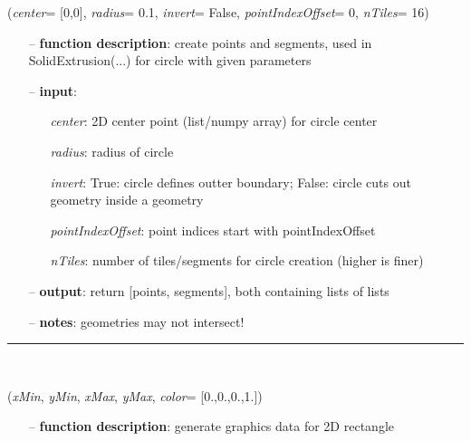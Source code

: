 \begin{itemize}[leftmargin=1.4cm]
\begin{itemize}[leftmargin=1.4cm]
\begin{itemize}[leftmargin=1.4cm]
\begin{itemize}[leftmargin=0.5cm]
\begin{itemize}[leftmargin=1.4cm]
\begin{itemize}[leftmargin=1.4cm]
\begin{itemize}[leftmargin=0.5cm]
\begin{itemize}[leftmargin=1.4cm]
\begin{itemize}[leftmargin=1.4cm]
\begin{itemize}[leftmargin=0.5cm]
\begin{flushleft}
\label{sec:graphicsDataUtilities:CirclePointsAndSegments}
({\it center}= [0,0], {\it radius}= 0.1, {\it invert}= False, {\it pointIndexOffset}= 0, {\it nTiles}= 16)
\end{flushleft}
\setlength{\itemindent}{0.7cm}
\begin{itemize}[leftmargin=0.7cm]
\item[--]
{\bf function description}: create points and segments, used in SolidExtrusion(...) for circle with given parameters
\item[--]
{\bf input}: \vspace{-6pt}
\begin{itemize}[leftmargin=1.2cm]
\setlength{\itemindent}{-0.7cm}
\item[]{\it center}: 2D center point (list/numpy array) for circle center
\item[]{\it radius}: radius of circle
\item[]{\it invert}: True: circle defines outter boundary; False: circle cuts out geometry inside a geometry
\item[]{\it pointIndexOffset}: point indices start with pointIndexOffset
\item[]{\it nTiles}: number of tiles/segments for circle creation (higher is finer)
\end{itemize}
\item[--]
{\bf output}: return [points, segments], both containing lists of lists
\item[--]
{\bf notes}: geometries may not intersect!
\vspace{12pt}\end{itemize}
%
\noindent\rule{8cm}{0.75pt}\vspace{1pt} \\ 
\begin{flushleft}
\label{sec:graphicsDataUtilities:GraphicsDataRectangle}
({\it xMin}, {\it yMin}, {\it xMax}, {\it yMax}, {\it color}= [0.,0.,0.,1.])
\end{flushleft}
\setlength{\itemindent}{0.7cm}
\begin{itemize}[leftmargin=0.7cm]
\item[--]
{\bf function description}: generate graphics data for 2D rectangle

\end{itemize}
\end{itemize}
\end{itemize}
\end{itemize}
\end{itemize}
\end{itemize}
\end{itemize}
\end{itemize}
\end{itemize}
\end{itemize}
\end{itemize}
